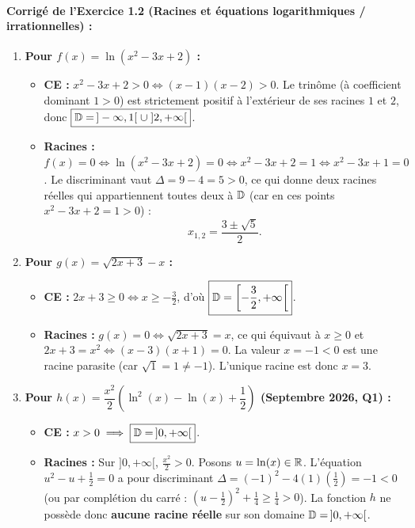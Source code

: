 \paragraph{Corrigé de l'Exercice 1.2 (Racines et équations logarithmiques / irrationnelles) :}
\begin{enumerate}[label=(\alph*)]
    \item \textbf{Pour $f(x) = \ln(x^2 - 3x + 2)$ :}
    \begin{itemize}
        \item \textbf{CE :} $x^2 - 3x + 2 > 0 \iff (x-1)(x-2) > 0$. Le trinôme (à coefficient dominant $1 > 0$) est strictement positif à l'extérieur de ses racines $1$ et $2$, donc $\boxed{\mathbb{D} = \,]-\infty, 1[ \;\cup\; ]2, +\infty[}$.
        \item \textbf{Racines :} $f(x) = 0 \iff \ln(x^2 - 3x + 2) = 0 \iff x^2 - 3x + 2 = 1 \iff x^2 - 3x + 1 = 0$. Le discriminant vaut $\Delta = 9 - 4 = 5 > 0$, ce qui donne deux racines réelles qui appartiennent toutes deux à $\mathbb{D}$ (car en ces points $x^2 - 3x + 2 = 1 > 0$) :
        \[
            \boxed{x_{1,2} = \frac{3 \pm \sqrt{5}}{2}}.
        \]
    \end{itemize}
    \item \textbf{Pour $g(x) = \sqrt{2x+3} - x$ :}
    \begin{itemize}
        \item \textbf{CE :} $2x + 3 \ge 0 \iff x \ge -\frac{3}{2}$, d'où $\boxed{\mathbb{D} = \left[-\frac{3}{2}, +\infty\right[}$.
        \item \textbf{Racines :} $g(x) = 0 \iff \sqrt{2x+3} = x$, ce qui équivaut à $x \ge 0$ et $2x + 3 = x^2 \iff (x-3)(x+1) = 0$.
        La valeur $x = -1 < 0$ est une racine parasite (car $\sqrt{1} = 1 \neq -1$). L'unique racine est donc $\boxed{x = 3}$.
    \end{itemize}
    \item \textbf{Pour $h(x) = \dfrac{x^2}{2}\left(\ln^2(x) - \ln(x) + \dfrac{1}{2}\right)$ (Septembre 2026, Q1) :}
    \begin{itemize}
        \item \textbf{CE :} $x > 0 \implies \boxed{\mathbb{D} = \,]0, +\infty[}$.
        \item \textbf{Racines :} Sur $]0, +\infty[$, $\frac{x^2}{2} > 0$. Posons $u = \ln(x) \in \mathbb{R}$. L'équation $u^2 - u + \frac{1}{2} = 0$ a pour discriminant $\Delta = (-1)^2 - 4(1)\left(\frac{1}{2}\right) = -1 < 0$ (ou par complétion du carré : $\left(u - \frac{1}{2}\right)^2 + \frac{1}{4} \ge \frac{1}{4} > 0$). La fonction $h$ ne possède donc \textbf{aucune racine réelle} sur son domaine $\mathbb{D} = \,]0, +\infty[$.
    \end{itemize}
\end{enumerate}

